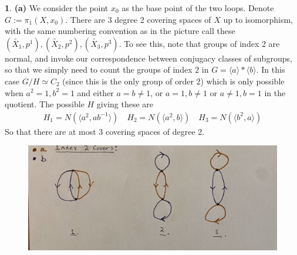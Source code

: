\documentclass[10.5pt]{article}
\theoremstyle{definition}
\newtheorem{pb}{}
\newcommand{\gen}[1]{\langle #1 \rangle}
\begin{document}
    \newpage
    \begin{pb}
        \textbf{(a)} We consider the point \(x_0\) as the base point of the two loops. 
        Denote \(G := \pi_1(X,x_0)\). There are 3 degree 2 covering spaces of \(X\) up to isomorphism, with the same numbering convention as in the picture call these \((\tilde{X_1},p^1),(\tilde{X_2},p^2),(\tilde{X_3},p^3)\). To see this, note that groups of index 2 are normal, and invoke our correspondence between conjugacy classes of subgroups, so that we simply need to count the groups of index \(2\) in \(G = \gen{a}*\gen{b}\). In this case \(G/H \simeq C_2\) (since this is the only group of order 2) which is only possible when \(a^2 = 1, b^2 = 1\) and either \(a = b \neq 1\), or \(a = 1, b \neq 1\) or \(a \neq 1, b = 1\) in the quotient. The possible \(H\) giving these are
        \begin{align*}
            H_1 = N(\gen{a^2,ab^{-1}}) \quad H_2 = N(\gen{a^2,b}) \quad H_3 = N(\gen{b^2,a})
        \end{align*}
        So that there are at most 3 covering spaces of degree 2. 
        
        \begin{figure}[h]
            \centering
            \includegraphics[width = \textwidth]{graphics/Degree 2 covers.jpg}
        \end{figure}
        

\end{pb}
\end{document}
